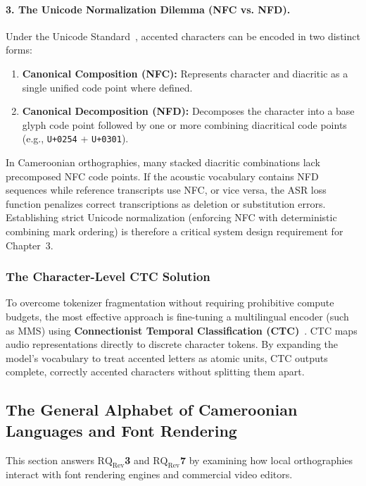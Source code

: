 \documentclass[a4paper,11pt]{article}
\begin{document}
\paragraph{3. The Unicode Normalization Dilemma (NFC vs. NFD).}
Under the Unicode Standard~\cite{unicode2024standard}, accented characters can be encoded in two distinct forms:
\begin{enumerate}
    \item \textbf{Canonical Composition (NFC):} Represents character and diacritic as a single unified code point where defined.
    \item \textbf{Canonical Decomposition (NFD):} Decomposes the character into a base glyph code point followed by one or more combining diacritical code points (e.g., \texttt{U+0254} + \texttt{U+0301}).
\end{enumerate}
In Cameroonian orthographies, many stacked diacritic combinations lack precomposed NFC code points. If the acoustic vocabulary contains NFD sequences while reference transcripts use NFC, or vice versa, the ASR loss function penalizes correct transcriptions as deletion or substitution errors. Establishing strict Unicode normalization (enforcing NFC with deterministic combining mark ordering) is therefore a critical system design requirement for Chapter~3.

\subsubsection{The Character-Level CTC Solution}
\label{sec:chap2_ctc_sol}
To overcome tokenizer fragmentation without requiring prohibitive compute budgets, the most effective approach is fine-tuning a multilingual encoder (such as MMS) using \textbf{Connectionist Temporal Classification (CTC)}~\cite{graves2006connectionist, kurzinger2020ctc}. CTC maps audio representations directly to discrete character tokens. By expanding the model's vocabulary to treat accented letters as atomic units, CTC outputs complete, correctly accented characters without splitting them apart.

\subsection{The General Alphabet of Cameroonian Languages and Font Rendering}
\label{sec:chap2_gacl}

This section answers \textbf{$\text{RQ}_{\text{Rev}}$3} and \textbf{$\text{RQ}_{\text{Rev}}$7} by examining how local orthographies interact with font rendering engines and commercial video editors.
\end{document}
